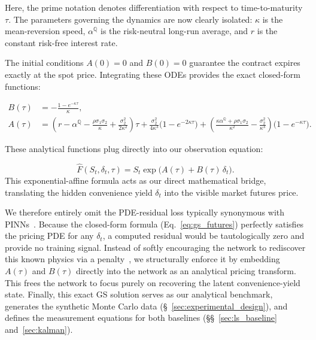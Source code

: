 \documentclass[11pt, a4paper]{article}
\newcommand{\convyield}{\delta}             %
\begin{document}
Here, the prime notation denotes differentiation with respect to time-to-maturity $\tau$. The parameters governing the dynamics are now clearly isolated: $\kappa$ is the mean-reversion speed, $\alpha^{\mathbb{Q}}$ is the risk-neutral long-run average, and $r$ is the constant risk-free interest rate. 

The initial conditions $A(0)=0$ and $B(0)=0$ guarantee the contract expires exactly at the spot price. Integrating these ODEs provides the exact closed-form functions:

\begin{align}
  \label{eq:gs_B_sol}
  B(\tau) &= -\frac{1 - e^{-\kappa\tau}}{\kappa}, \\
  \label{eq:gs_A_sol}
  A(\tau) &= \left(r - \alpha^{\mathbb{Q}} - \frac{\rho\sigma_1\sigma_2}{\kappa} + \frac{\sigma_2^2}{2\kappa^2}\right)\tau 
             + \frac{\sigma_2^2}{4\kappa^3}\big(1 - e^{-2\kappa\tau}\big) 
             + \left(\frac{\kappa\alpha^{\mathbb{Q}} + \rho\sigma_1\sigma_2}{\kappa^2} - \frac{\sigma_2^2}{\kappa^3}\right)\big(1 - e^{-\kappa\tau}\big).
\end{align}

These analytical functions plug directly into our observation equation:

\begin{equation}
  \label{eq:gs_futures}
  \hat{F}(S_t, \convyield_t, \tau) = S_t \exp\!\big(
    A(\tau) + B(\tau)\,\convyield_t
  \big).
\end{equation}
\noindent
This exponential-affine formula acts as our direct mathematical bridge, translating the hidden convenience yield $\convyield_t$ into the visible market futures price.

We therefore entirely omit the PDE-residual loss typically synonymous with PINNs~\cite{Raissi2019Physics-informedEquations}. Because the closed-form formula (Eq.~\ref{eq:gs_futures}) perfectly satisfies the pricing PDE for any $\convyield_t$, a computed residual would be tautologically zero and provide no training signal. Instead of softly encouraging the network to rediscover this known physics via a penalty~\cite{Raissi2019Physics-informedEquations, Hoshisashi2024Physics-InformedPDEs}, we structurally enforce it by embedding $A(\tau)$ and $B(\tau)$ directly into the network as an analytical pricing transform. This frees the network to focus purely on recovering the latent convenience-yield state. Finally, this exact GS solution serves as our analytical benchmark, generates the synthetic Monte Carlo data (\S~\ref{sec:experimental_design}), and defines the measurement equations for both baselines (\S\S~\ref{sec:ls_baseline} and~\ref{sec:kalman}).
\end{document}
